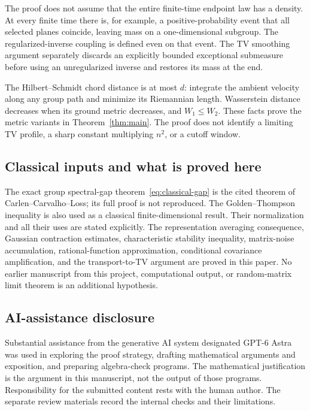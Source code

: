 \documentclass[11pt]{article}
\theoremstyle{definition}\newtheorem{definition}[theorem]{Definition}
\theoremstyle{remark}\newtheorem{remark}[theorem]{Remark}
\begin{document}
The proof does not assume that the entire finite-time endpoint law has a density. At every finite time there is, for example, a positive-probability event that all selected planes coincide, leaving mass on a one-dimensional subgroup. The regularized-inverse coupling is defined even on that event. The TV smoothing argument separately discards an explicitly bounded exceptional submeasure before using an unregularized inverse and restores its mass at the end.

The Hilbert--Schmidt chord distance is at most $d$: integrate the ambient velocity along any group path and minimize its Riemannian length. Wasserstein distance decreases when its ground metric decreases, and $W_1\le W_2$. These facts prove the metric variants in Theorem~\ref{thm:main}. The proof does not identify a limiting TV profile, a sharp constant multiplying $n^2$, or a cutoff window.

\subsection*{Classical inputs and what is proved here}
The exact group spectral-gap theorem~\eqref{eq:classical-gap} is the cited theorem of Carlen--Carvalho--Loss; its full proof is not reproduced. The Golden--Thompson inequality is also used as a classical finite-dimensional result. Their normalization and all their uses are stated explicitly. The representation averaging consequence, Gaussian contraction estimates, characteristic stability inequality, matrix-noise accumulation, rational-function approximation, conditional covariance amplification, and the transport-to-TV argument are proved in this paper. No earlier manuscript from this project, computational output, or random-matrix limit theorem is an additional hypothesis.

\subsection*{AI-assistance disclosure}
Substantial assistance from the generative AI system designated GPT-6 Astra was used in exploring the proof strategy, drafting mathematical arguments and exposition, and preparing algebra-check programs. The mathematical justification is the argument in this manuscript, not the output of those programs. Responsibility for the submitted content rests with the human author. The separate review materials record the internal checks and their limitations.
\end{document}
